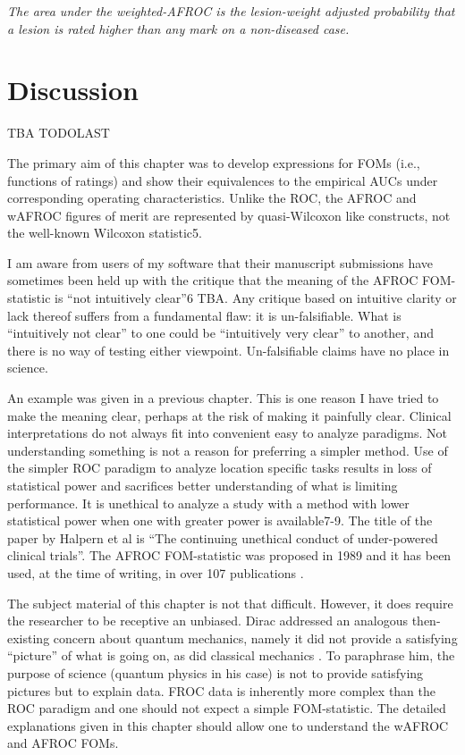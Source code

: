\documentclass[
]{book}
\begin{document}
\emph{The area under the weighted-AFROC is the lesion-weight adjusted probability that a lesion is rated higher than any mark on a non-diseased case.}

\hypertarget{froc-meanings-Discussion}{%
\section{Discussion}\label{froc-meanings-Discussion}}

TBA
TODOLAST

The primary aim of this chapter was to develop expressions for FOMs (i.e., functions of ratings) and show their equivalences to the empirical AUCs under corresponding operating characteristics. Unlike the ROC, the AFROC and wAFROC figures of merit are represented by quasi-Wilcoxon like constructs, not the well-known Wilcoxon statistic5.

I am aware from users of my software that their manuscript submissions have sometimes been held up with the critique that the meaning of the AFROC FOM-statistic is ``not intuitively clear''6 TBA. Any critique based on intuitive clarity or lack thereof suffers from a fundamental flaw: it is un-falsifiable. What is ``intuitively not clear'' to one could be ``intuitively very clear'' to another, and there is no way of testing either viewpoint. Un-falsifiable claims have no place in science.

An example was given in a previous chapter. This is one reason I have tried to make the meaning clear, perhaps at the risk of making it painfully clear. Clinical interpretations do not always fit into convenient easy to analyze paradigms. Not understanding something is not a reason for preferring a simpler method. Use of the simpler ROC paradigm to analyze location specific tasks results in loss of statistical power and sacrifices better understanding of what is limiting performance. It is unethical to analyze a study with a method with lower statistical power when one with greater power is available7-9. The title of the paper by Halpern et al is ``The continuing unethical conduct of under-powered clinical trials''. The AFROC FOM-statistic was proposed in 1989 and it has been used, at the time of writing, in over 107 publications .

The subject material of this chapter is not that difficult. However, it does require the researcher to be receptive an unbiased. Dirac addressed an analogous then-existing concern about quantum mechanics, namely it did not provide a satisfying ``picture'' of what is going on, as did classical mechanics . To paraphrase him, the purpose of science (quantum physics in his case) is not to provide satisfying pictures but to explain data. FROC data is inherently more complex than the ROC paradigm and one should not expect a simple FOM-statistic. The detailed explanations given in this chapter should allow one to understand the wAFROC and AFROC FOMs.
\end{document}
